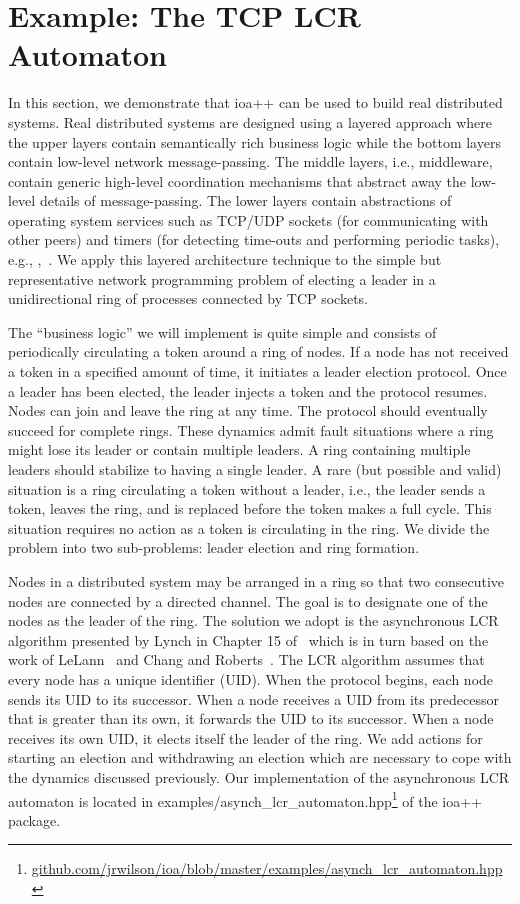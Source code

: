 \section{Example:  The TCP LCR Automaton\label{case_study}}

In this section, we demonstrate that ioa++ can be used to build real distributed systems.
Real distributed systems are designed using a layered approach where the upper layers contain semantically rich business logic while the bottom layers contain low-level network message-passing.
The middle layers, i.e., middleware, contain generic high-level coordination mechanisms that abstract away the low-level details of message-passing.
The lower layers contain abstractions of operating system services such as TCP/UDP sockets (for communicating with other peers) and timers (for detecting time-outs and performing periodic tasks), e.g., \cite{schmidt2001c++},~\cite{schmidt2002c++}.
We apply this layered architecture technique to the simple but representative network programming problem of electing a leader in a unidirectional ring of processes connected by TCP sockets.

The ``business logic'' we will implement is quite simple and consists of periodically circulating a token around a ring of nodes.
If a node has not received a token in a specified amount of time, it initiates a leader election protocol.
Once a leader has been elected, the leader injects a token and the protocol resumes.
Nodes can join and leave the ring at any time.
The protocol should eventually succeed for complete rings.
These dynamics admit fault situations where a ring might lose its leader or contain multiple leaders.
A ring containing multiple leaders should stabilize to having a single leader.
A rare (but possible and valid) situation is a ring circulating a token without a leader, i.e., the leader sends a token, leaves the ring, and is replaced before the token makes a full cycle.
This situation requires no action as a token is circulating in the ring.
We divide the problem into two sub-problems:  leader election and ring formation.

Nodes in a distributed system may be arranged in a ring so that two consecutive nodes are connected by a directed channel.
The goal is to designate one of the nodes as the leader of the ring.
The solution we adopt is the asynchronous LCR algorithm presented by Lynch in Chapter 15 of~\cite{lynch1996distributed} which is in turn based on the work of LeLann~\cite{le1977distributed} and Chang and Roberts~\cite{chang1979improved}.
The LCR algorithm assumes that every node has a unique identifier (UID).
When the protocol begins, each node sends its UID to its successor.
When a node receives a UID from its predecessor that is greater than its own, it forwards the UID to its successor.
When a node receives its own UID, it elects itself the leader of the ring.
We add actions for starting an election and withdrawing an election which are necessary to cope with the dynamics discussed previously.
Our implementation of the asynchronous LCR automaton is located in examples/asynch\_lcr\_automaton.hpp\footnote{\url{github.com/jrwilson/ioa/blob/master/examples/asynch_lcr_automaton.hpp}} of the ioa++ package.

